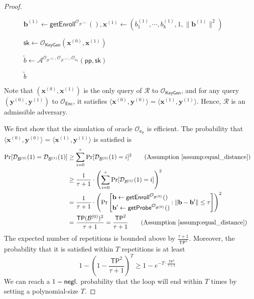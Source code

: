 \begin{proof}
\begin{figure}[h]
\begin{minipage}[t]{0.75\linewidth}
\begin{algorithm}[H]
\begin{algorithmic}[1]
		\State $\mathbf{b}^{(1)} \gets \textsf{getEnroll}^{\mathcal{O}_{\mathcal{B}^{(1)}}}(), \mathbf{x}^{(1)} \gets (b_1^{(1)}, \cdots, b_k^{(1)}, 1, \|\mathbf{b}^{(1)}\|^2)$
		
		\State $\textsf{sk} \gets \mathcal{O}_{\textsf{KeyGen}}(\mathbf{x}^{(0)}, \mathbf{x}^{(1)})$ \label{alg:red:ind-ind:cx}

		\State $\tilde{b} \gets {\mathcal{A}}^{\mathcal{O}_{\mathcal{B}^{(0)}}, \mathcal{O}_{\mathcal{B}^{(1)}}, \mathcal{O}_{\mathbf{c_y}} } (\textsf{pp}, \textsf{sk})$ \label{alg:red:ind-ind:A}

		\State \Return $\tilde{b}$

	\end{algorithmic}
	\end{algorithm}
	\end{minipage}
	
\end{figure}

\noindent Note that $(\mathbf{x}^{(0)}, \mathbf{x}^{(1)})$ is the only query of $\mathcal{R}$ to $\mathcal{O}_{\textsf{KeyGen}}$, and for any query $( \mathbf{y}^{(0)}, {\mathbf{y}^{(1)}} )$ to $\mathcal{O}_{\textsf{Enc}}$, it satisfies $\langle \mathbf{x}^{(0)}, {\mathbf{y}^{(0)}} \rangle = \langle \mathbf{x}^{(1)}, {\mathbf{y}^{(1)}} \rangle$. Hence, $\mathcal{R}$ is an admissible adversary.

We first show that the simulation of oracle $\mathcal{O}_{\mathbf{c_y}}$ is efficient. The probability that $\langle \mathbf{x}^{(0)}, {\mathbf{y}^{(0)}} \rangle = \langle \mathbf{x}^{(1)}, {\mathbf{y}^{(1)}} \rangle$ is satisfied is
\begin{align*}
	\Pr[\mathcal{D}_{\mathcal{B}^{(0)}}(1) = \mathcal{D}_{\mathcal{B}^{(1)}}(1)] 
	&\geq \sum_{i=0}^\tau \Pr[\mathcal{D}_{\mathcal{B}^{(0)}}(1) = i]^2 \qquad \text{(Assumption \ref{assump:equal_distance})} \\
	&\geq \frac{1}{\tau + 1} \cdot \left( \sum_{i=0}^\tau \Pr[\mathcal{D}_{\mathcal{B}^{(0)}}(1) = i] \right)^2 \\
	&= \frac{1}{\tau + 1} \cdot \left( \Pr \left[
		\begin{aligned}
			& \mathbf{b} \gets \textsf{getEnroll}^{\mathcal{O}_{\mathcal{B}^{(0)}} }() \\
			& \mathbf{b}^\prime \gets \textsf{getProbe}^{\mathcal{O}_{\mathcal{B}^{(0)}} }()
		\end{aligned}
		: \| \mathbf{b} - \mathbf{b}^\prime \| \leq \tau \right] \right)^2 \\
	&= \frac{ \textsf{TP}(\mathcal{B}^{(0)})^2 }{\tau + 1} = \frac{ \textsf{TP}^2 }{\tau + 1} \qquad \text{(Assumption \ref{assump:equal_distance})} 
\end{align*}
The expected number of repetitions is bounded above by $\frac{\tau + 1}{ \textsf{TP}^2 }$. Moreover, the probability that it is satisfied within $T$ repetitions is at least
\[
	1 - (1 - \frac{ \textsf{TP}^2 }{\tau + 1})^T \geq 1 - e^{-T \cdot \frac{ \textsf{TP}^2 }{\tau + 1}}
\]
We can reach a $1 - \mathsf{negl}.$ probability that the loop will end within $T$ times by setting a polynomial-size $T$.


\end{proof}
